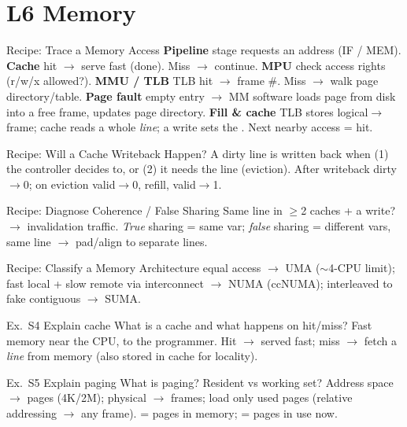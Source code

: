 \section{L6 Memory}

\begin{KR}{Recipe: Trace a Memory Access}
    \textbf{Pipeline} stage requests an address (IF / MEM).
    \textbf{Cache} hit $\to$ serve fast (done). Miss $\to$ continue.
    \textbf{MPU} check access rights (r/w/x allowed?).
    \textbf{MMU / TLB} TLB hit $\to$ frame \#. Miss $\to$ walk page directory/table.
    \textbf{Page fault} empty entry $\to$ MM software loads page from disk into a free frame, updates page directory.
    \textbf{Fill \& cache} TLB stores logical$\to$frame; cache reads a whole \emph{line}; a write sets the . Next nearby access = hit.
\end{KR}

\begin{KR}{Recipe: Will a Cache Writeback Happen?}
    A dirty line is written back when (1) the controller decides to, or (2) it needs the line (eviction). After writeback dirty$\to$0; on eviction valid$\to$0, refill, valid$\to$1.
\end{KR}

\begin{KR}{Recipe: Diagnose Coherence / False Sharing}
    Same line in $\geq$2 caches + a write? $\to$ invalidation traffic. \emph{True} sharing = same var; \emph{false} sharing = different vars, same line $\to$ pad/align to separate lines.
\end{KR}

\begin{KR}{Recipe: Classify a Memory Architecture}
    equal access $\to$ UMA ($\sim$4-CPU limit); fast local + slow remote via interconnect $\to$ NUMA (ccNUMA); interleaved to fake contiguous $\to$ SUMA.
\end{KR}

\begin{example2}{Ex.\ S4 Explain cache}
    What is a cache and what happens on hit/miss?
    \tcblower
    Fast memory near the CPU,  to the programmer. Hit $\to$ served fast; miss $\to$ fetch a \emph{line} from memory (also stored in cache for locality).
\end{example2}

\begin{example2}{Ex.\ S5 Explain paging}
    What is paging? Resident vs working set?
    \tcblower
    Address space $\to$ pages (4K/2M); physical $\to$ frames; load only used pages (relative addressing $\to$ any frame).  = pages in memory;  = pages in use now.
\end{example2}

